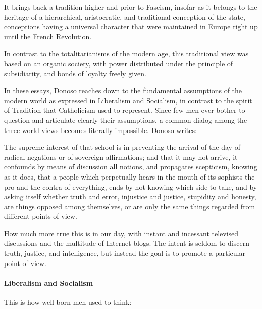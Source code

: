 \begin{quotex}
It brings back a tradition higher and prior to Fascism, insofar as it belongs to the heritage of a hierarchical, aristocratic, and traditional conception of the state, conceptions having a universal character that were maintained in Europe right up until the French Revolution.
\end{quotex}


In contrast to the totalitarianisms of the modern age, this traditional view was based on an organic society, with power distributed under the principle of subsidiarity, and bonds of loyalty freely given.

In these essays, Donoso reaches down to the fundamental assumptions of the modern world as expressed in Liberalism and Socialism, in contrast to the spirit of Tradition that Catholicism used to represent. Since few men ever bother to question and articulate clearly their assumptions, a common dialog among the three world views becomes literally impossible. Donoso writes:

\begin{quotex}
The supreme interest of that school is in preventing the arrival of the day of radical negations or of sovereign affirmations; and that it may not arrive, it confounds by means of discussion all notions, and propagates scepticism, knowing as it does, that a people which perpetually hears in the mouth of its sophists the pro and the contra of everything, ends by not knowing which side to take, and by asking itself whether truth and error, injustice and justice, stupidity and honesty, are things opposed among themselves, or are only the same things regarded from different points of view.
\end{quotex}


How much more true this is in our day, with instant and incessant televised discussions and the multitude of Internet blogs. The intent is seldom to discern truth, justice, and intelligence, but instead the goal is to promote a particular point of view.

\paragraph{Liberalism and Socialism}

This is how well-born men used to think:

